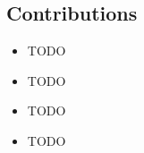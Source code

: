 \subsection*{Contributions}
\begin{itemize}
    \item TODO
    \item TODO
    \item TODO
    \item TODO
\end{itemize}
